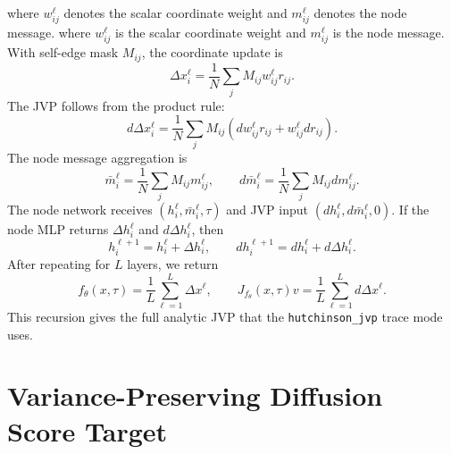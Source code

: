 \documentclass[reprint,amsmath,amssymb,aps,pra,10pt]{revtex4-2}
\begin{document}
where $w_{ij}^\ell$ denotes the scalar coordinate weight and $m_{ij}^\ell$ denotes the node message.
where $w_{ij}^\ell$ is the scalar coordinate weight and $m_{ij}^\ell$ is the node message.
With self-edge mask $M_{ij}$, the coordinate update is
\begin{equation}
    \Delta x_i^\ell
    =
    \frac{1}{N}
    \sum_j
    M_{ij}
    w_{ij}^\ell r_{ij}.
\end{equation}
The JVP follows from the product rule:
\begin{equation}
    d\Delta x_i^\ell
    =
    \frac{1}{N}
    \sum_j
    M_{ij}
    \left(
        dw_{ij}^\ell r_{ij}
        +
        w_{ij}^\ell dr_{ij}
    \right).
\end{equation}
The node message aggregation is
\begin{equation}
    \bar{m}_i^\ell
    =
    \frac{1}{N}
    \sum_j
    M_{ij}m_{ij}^\ell,
    \qquad
    d\bar{m}_i^\ell
    =
    \frac{1}{N}
    \sum_j
    M_{ij}dm_{ij}^\ell.
\end{equation}
The node network receives $(h_i^\ell,\bar{m}_i^\ell,\tau)$ and JVP input $(dh_i^\ell,d\bar{m}_i^\ell,0)$.
If the node MLP returns $\Delta h_i^\ell$ and $d\Delta h_i^\ell$, then
\begin{equation}
    h_i^{\ell+1}
    =
    h_i^\ell+\Delta h_i^\ell,
    \qquad
    dh_i^{\ell+1}
    =
    dh_i^\ell+d\Delta h_i^\ell.
\end{equation}
After repeating for $L$ layers, we return
\begin{equation}
    f_\theta(x,\tau)
    =
    \frac{1}{L}
    \sum_{\ell=1}^{L}
    \Delta x^\ell,
    \qquad
    J_{f_\theta}(x,\tau)v
    =
    \frac{1}{L}
    \sum_{\ell=1}^{L}
    d\Delta x^\ell.
\end{equation}
This recursion gives the full analytic JVP that the \texttt{hutchinson\_jvp} trace mode uses.

\section{Variance-Preserving Diffusion Score Target}
\end{document}

